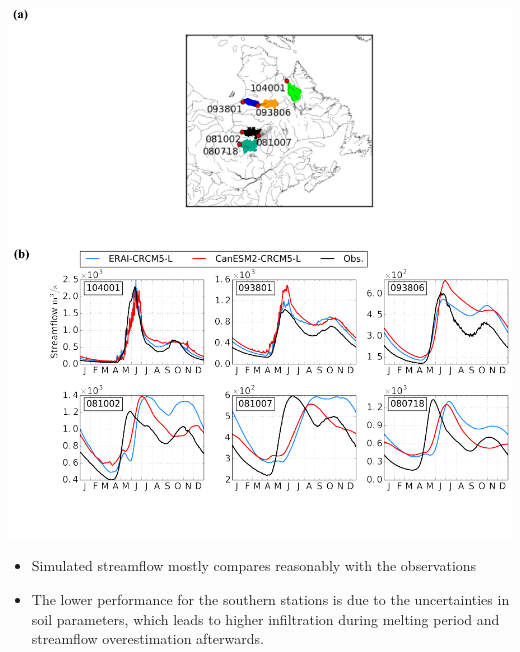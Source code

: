 \documentclass[a0,landscape]{a0poster}
\begin{document}
\begin{multicols}{3}
\begin{minipage}[b]{0.60\linewidth}
\begin{center}
  \includegraphics[width=\linewidth]{streamflow_validation_6}
\end{center}
\end{minipage}
%
\begin{itemize}
  \item Simulated streamflow mostly compares reasonably with the observations
  \item The lower performance for the southern stations is due to the uncertainties in soil parameters, which leads to higher infiltration during melting period and streamflow overestimation afterwards.
\end{itemize}



\end{multicols}
\end{document}
